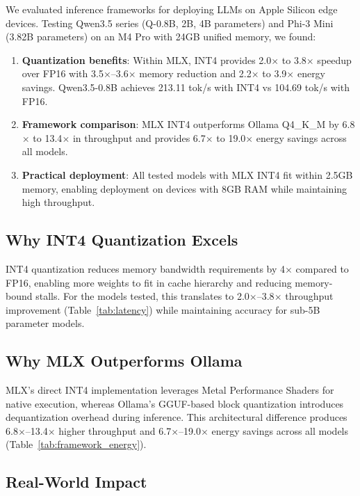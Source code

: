 \documentclass[conference]{IEEEtran}
\begin{document}
We evaluated inference frameworks for deploying LLMs on Apple Silicon edge devices. Testing Qwen3.5 series (Q-0.8B, 2B, 4B parameters) and Phi-3 Mini (3.82B parameters) on an M4 Pro with 24GB unified memory, we found:

\begin{enumerate}[leftmargin=*,nosep]
    \item \textbf{Quantization benefits}: Within MLX, INT4 provides 2.0$\times$ to 3.8$\times$ speedup over FP16 with 3.5$\times$--3.6$\times$ memory reduction and 2.2$\times$ to 3.9$\times$ energy savings. Qwen3.5-0.8B achieves 213.11 tok/s with INT4 vs 104.69 tok/s with FP16.

    \item \textbf{Framework comparison}: MLX INT4 outperforms Ollama Q4\_K\_M by 6.8$\times$ to 13.4$\times$ in throughput and provides 6.7$\times$ to 19.0$\times$ energy savings across all models.

    \item \textbf{Practical deployment}: All tested models with MLX INT4 fit within 2.5GB memory, enabling deployment on devices with 8GB RAM while maintaining high throughput.
\end{enumerate}

\subsection{Why INT4 Quantization Excels}

INT4 quantization reduces memory bandwidth requirements by 4$\times$ compared to FP16, enabling more weights to fit in cache hierarchy and reducing memory-bound stalls. For the models tested, this translates to 2.0$\times$--3.8$\times$ throughput improvement (Table~\ref{tab:latency}) while maintaining accuracy for sub-5B parameter models.

\subsection{Why MLX Outperforms Ollama}

MLX's direct INT4 implementation leverages Metal Performance Shaders for native execution, whereas Ollama's GGUF-based block quantization introduces dequantization overhead during inference. This architectural difference produces 6.8$\times$--13.4$\times$ higher throughput and 6.7$\times$--19.0$\times$ energy savings across all models (Table~\ref{tab:framework_energy}).

\subsection{Real-World Impact}
\end{document}
